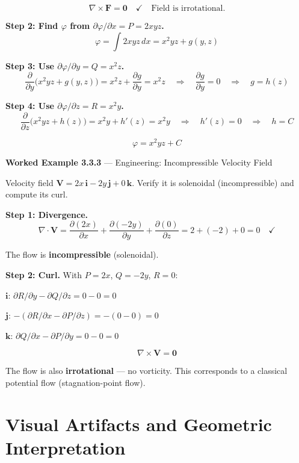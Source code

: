 \documentclass[12pt,a4paper]{article}
\begin{document}
\[
  \nabla \times \mathbf{F} = \mathbf{0} \quad \checkmark \quad \text{Field is irrotational.}
\]

\textbf{Step 2: Find $\varphi$ from $\partial \varphi/\partial x = P = 2xyz$.}
\[
  \varphi = \int 2xyz\, dx = x^2 yz + g(y, z)
\]

\textbf{Step 3: Use $\partial \varphi/\partial y = Q = x^2 z$.}
\[
  \frac{\partial}{\partial y}\bigl(x^2 yz + g(y,z)\bigr) = x^2 z + \frac{\partial g}{\partial y} = x^2 z
  \quad \Rightarrow \quad \frac{\partial g}{\partial y} = 0 \quad \Rightarrow \quad g = h(z)
\]

\textbf{Step 4: Use $\partial \varphi/\partial z = R = x^2 y$.}
\[
  \frac{\partial}{\partial z}\bigl(x^2 yz + h(z)\bigr) = x^2 y + h'(z) = x^2 y
  \quad \Rightarrow \quad h'(z) = 0 \quad \Rightarrow \quad h = C
\]

\[
  \boxed{\varphi = x^2 yz + C}
\]

\textbf{Worked Example 3.3.3} --- Engineering: Incompressible Velocity Field

Velocity field $\mathbf{V} = 2x\,\mathbf{i} - 2y\,\mathbf{j} + 0\,\mathbf{k}$. Verify it is solenoidal (incompressible) and compute its curl.

\textbf{Step 1: Divergence.}
\[
  \nabla \cdot \mathbf{V} = \frac{\partial(2x)}{\partial x} + \frac{\partial(-2y)}{\partial y} + \frac{\partial(0)}{\partial z}
  = 2 + (-2) + 0 = 0 \quad \checkmark
\]

The flow is \textbf{incompressible} (solenoidal).

\textbf{Step 2: Curl.} With $P = 2x$, $Q = -2y$, $R = 0$:

$\mathbf{i}$: $\partial R/\partial y - \partial Q/\partial z = 0 - 0 = 0$

$\mathbf{j}$: $-(\partial R/\partial x - \partial P/\partial z) = -(0 - 0) = 0$

$\mathbf{k}$: $\partial Q/\partial x - \partial P/\partial y = 0 - 0 = 0$

\[
  \nabla \times \mathbf{V} = \mathbf{0}
\]

The flow is also \textbf{irrotational} --- no vorticity. This corresponds to a classical potential flow (stagnation-point flow).

\section{Visual Artifacts and Geometric Interpretation}
\end{document}

